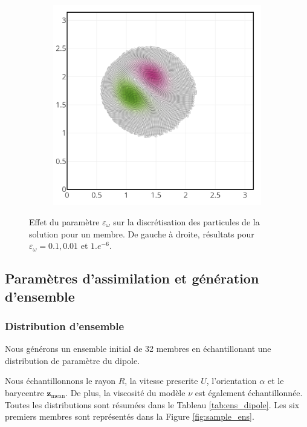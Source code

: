 \begin{figure}[htbp]
\begin{subfigure}{0.3\textwidth}
    \end{subfigure}
    \hfill
    \begin{subfigure}{0.3\textwidth}
        \includegraphics[width=\linewidth]{images/app2d/part_eps_1e-6.png}
    \end{subfigure}
    \caption{Effet du paramètre $\varepsilon_\omega$ sur la discrétisation des particules de la solution pour un membre. De gauche à droite, résultats pour $\varepsilon_\omega = 0.1, 0.01$ et $1.e^{-6}$.}
    \label{fig:eps_effect}
\end{figure}


\subsection{Paramètres d'assimilation et génération d'ensemble}

\subsubsection{Distribution d'ensemble}
Nous générons un ensemble initial de 32 membres en échantillonant une distribution de paramètre du dipole.

Nous échantillonnons le rayon \(R\), la vitesse prescrite \(U\), l'orientation \(\alpha\) et le barycentre \(\bm{z}_{\text{mean}}\). De plus, la viscosité du modèle \(\nu\) est également échantillonnée. Toutes les distributions sont résumées dans le Tableau \ref{tab:ens_dipole}. Les six premiers membres sont représentés dans la Figure \ref{fig:sample_ens}.

